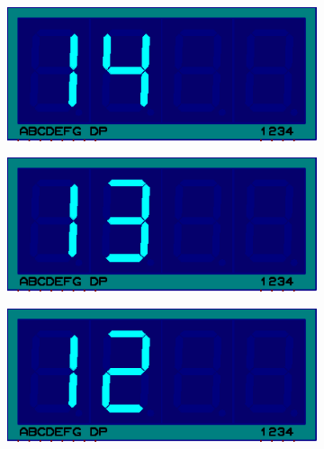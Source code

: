 \documentclass{lab_sheet}
\begin{document}
\begin{figure}[H]
\begin{subfigure}{.33\textwidth}
            \caption{}
            \label{fig:prob2-z}
          \end{subfigure}
          \begin{subfigure}{.33\textwidth}
            \centering
            \includegraphics[frame,width=.9\linewidth]{../Figures/d14}   
            \caption{}
            \label{fig:prob2-a1}
          \end{subfigure}
          \newline
          \begin{subfigure}{.33\textwidth}
            \centering
            \includegraphics[frame,width=.9\linewidth]{../Figures/d13}   
            \caption{}
            \label{fig:prob2-a2}
          \end{subfigure}
          \begin{subfigure}{.33\textwidth}
            \centering
            \includegraphics[frame,width=.9\linewidth]{../Figures/d12}   
            \caption{}
            \label{fig:prob2-a3}
          \end{subfigure}

\end{figure}
\end{document}
